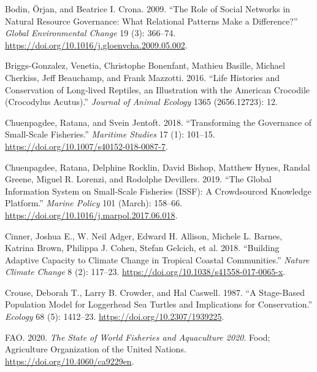 \documentclass[
]{article}
\newlength{\cslhangindent}
\newlength{\cslentryspacingunit} %
\newenvironment{CSLReferences}[2] %
 {%
  \setlength{\parindent}{0pt}
  \ifodd #1
  \let\oldpar\par
  \def\par{\hangindent=\cslhangindent\oldpar}
  \fi
  \setlength{\parskip}{#2\cslentryspacingunit}
 }%
 {}
\begin{document}
\begin{CSLReferences}{1}{0}
\leavevmode{}%
Bodin, Örjan, and Beatrice I. Crona. 2009. {``The Role of Social Networks in Natural Resource Governance: {What} Relational Patterns Make a Difference?''} \emph{Global Environmental Change} 19 (3): 366--74. \url{https://doi.org/10.1016/j.gloenvcha.2009.05.002}.

\leavevmode{}%
Briggs-Gonzalez, Venetia, Christophe Bonenfant, Mathieu Basille, Michael Cherkiss, Jeff Beauchamp, and Frank Mazzotti. 2016. {``Life Histories and Conservation of Long‐lived Reptiles, an Illustration with the {American} Crocodile ({Crocodylus} Acutus).''} \emph{Journal of Animal Ecology} 1365 (2656.12723): 12.

\leavevmode{}%
Chuenpagdee, Ratana, and Svein Jentoft. 2018. {``Transforming the Governance of Small-Scale Fisheries.''} \emph{Maritime Studies} 17 (1): 101--15. \url{https://doi.org/10.1007/s40152-018-0087-7}.

\leavevmode{}%
Chuenpagdee, Ratana, Delphine Rocklin, David Bishop, Matthew Hynes, Randal Greene, Miguel R. Lorenzi, and Rodolphe Devillers. 2019. {``The Global Information System on Small-Scale Fisheries ({ISSF}): {A} Crowdsourced Knowledge Platform.''} \emph{Marine Policy} 101 (March): 158--66. \url{https://doi.org/10.1016/j.marpol.2017.06.018}.

\leavevmode{}%
Cinner, Joshua E., W. Neil Adger, Edward H. Allison, Michele L. Barnes, Katrina Brown, Philippa J. Cohen, Stefan Gelcich, et al. 2018. {``Building Adaptive Capacity to Climate Change in Tropical Coastal Communities.''} \emph{Nature Climate Change} 8 (2): 117--23. \url{https://doi.org/10.1038/s41558-017-0065-x}.

\leavevmode{}%
Crouse, Deborah T., Larry B. Crowder, and Hal Caswell. 1987. {``A {Stage}-{Based} {Population} {Model} for {Loggerhead} {Sea} {Turtles} and {Implications} for {Conservation}.''} \emph{Ecology} 68 (5): 1412--23. \url{https://doi.org/10.2307/1939225}.

\leavevmode{}%
FAO. 2020. \emph{The {State} of {World} {Fisheries} and {Aquaculture} 2020}. Food; Agriculture Organization of the United Nations. \url{https://doi.org/10.4060/ca9229en}.


\end{CSLReferences}
\end{document}
